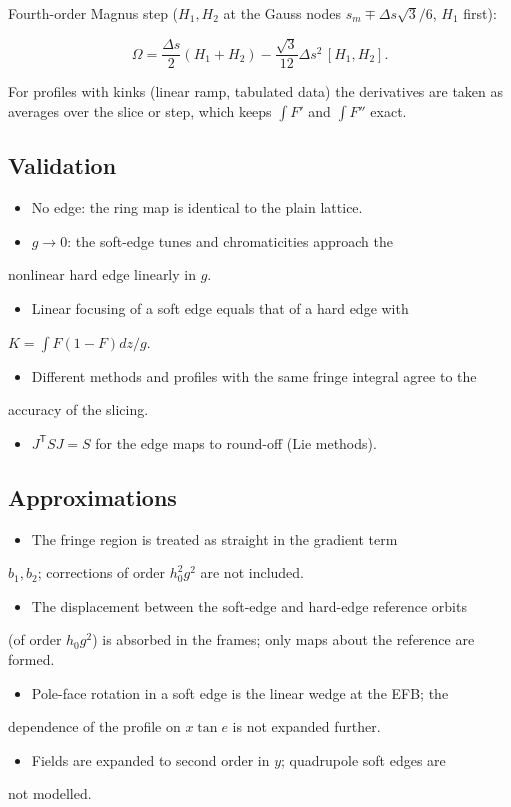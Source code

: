 \documentclass[11pt,a4paper]{article}
\begin{document}
Fourth-order Magnus step ($H_1, H_2$ at the Gauss nodes
$s_m \mp \Delta s\sqrt3/6$, $H_1$ first):

\[
\Omega = \frac{\Delta s}{2}(H_1+H_2) - \frac{\sqrt3}{12}\Delta s^2\,[H_1,H_2] .
\]

For profiles with kinks (linear ramp, tabulated data) the derivatives are
taken as averages over the slice or step, which keeps $\int F'$ and
$\int F''$ exact.

\subsection{Validation}

\begin{itemize}
\item No edge: the ring map is identical to the plain lattice.
\item $g\to 0$: the soft-edge tunes and chromaticities approach the
\end{itemize}
  nonlinear hard edge linearly in $g$.
\begin{itemize}
\item Linear focusing of a soft edge equals that of a hard edge with
\end{itemize}
  $K = \int F(1-F)dz/g$.
\begin{itemize}
\item Different methods and profiles with the same fringe integral agree to the
\end{itemize}
  accuracy of the slicing.
\begin{itemize}
\item $J^{\mathsf T} S J = S$ for the edge maps to round-off (Lie methods).
\end{itemize}

\subsection{Approximations}

\begin{itemize}
\item The fringe region is treated as straight in the gradient term
\end{itemize}
  $b_1, b_2$; corrections of order $h_0^2 g^2$ are not included.
\begin{itemize}
\item The displacement between the soft-edge and hard-edge reference orbits
\end{itemize}
  (of order $h_0 g^2$) is absorbed in the frames; only maps about the
  reference are formed.
\begin{itemize}
\item Pole-face rotation in a soft edge is the linear wedge at the EFB; the
\end{itemize}
  dependence of the profile on $x\tan e$ is not expanded further.
\begin{itemize}
\item Fields are expanded to second order in $y$; quadrupole soft edges are
\end{itemize}
  not modelled.
\end{document}
